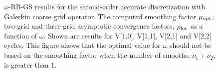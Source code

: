 \documentclass{article}
\begin{document}
{
\renewcommand{\figWidth}{5.25cm}
\newcommand{\trimfig}[2]{\trimwb{#1}{#2}{.0}{.0}{.0}{.0}}
\begin{figure}[hbt]
\begin{center}
\end{center}
\caption{$\omega$-RB-GS results for the second-order accurate discretization with Galerkin coarse grid operator.
The computed smoothing factor $\mu_{\rm opt}$, two-grid and three-grid asymptotic convergence factors,
$\rho_{\rm loc}$ as a function of $\omega$. Shown are results for V[1,0], V[1,1], V[2,1] and V[2,2] cycles.
This figure shows that the optimal value for $\omega$ should not be based on the smoothing factor
when the number of smooths, $\nu_1+\nu_2$, is greater than 1. }
\label{fig:redBlackLFA2}
\end{figure}
}

\end{document}
